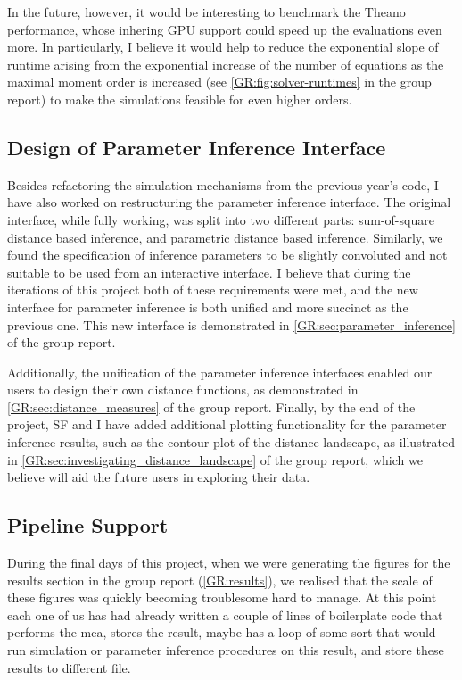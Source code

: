 In the future, however, it would be interesting to benchmark the Theano performance, whose inhering GPU support could speed up the evaluations even more.
In particularly, I believe it would help to reduce the exponential slope of runtime arising from the exponential increase of the number of equations as the maximal moment order is increased (see \autoref{GR:fig:solver-runtimes} in the group report) to make the simulations feasible for even higher orders. 

\subsection{Design of Parameter Inference Interface}

Besides refactoring the simulation mechanisms from the previous year's code, I have also worked on restructuring the parameter inference interface. 
The original interface, while fully working, was split into two different parts: sum-of-square distance based inference, and parametric distance based inference. Similarly, we found the specification of inference parameters to be slightly convoluted and not suitable to be used from an interactive interface. 
I believe that during the iterations of this project both of these requirements were met, and the new interface for parameter inference is
both unified and more succinct as the previous one. This new interface is demonstrated in \autoref*{GR:sec:parameter_inference} of the group report.

Additionally, the unification of the parameter inference interfaces enabled our users to design their own distance functions, as demonstrated in \autoref*{GR:sec:distance_measures} of the group report.
Finally, by the end of the project, SF and I have added additional plotting functionality for the parameter inference results, such as the contour plot of the distance landscape, as illustrated in 
\autoref*{GR:sec:investigating_distance_landscape} of the group report, which we believe will aid the future users in exploring their data.

\subsection{Pipeline Support}

During the final days of this project, when we were generating the figures for the results section in the group report (\autoref{GR:results}), we realised that the scale of these figures was quickly becoming troublesome hard to manage. 
At this point each one of us has had already written a couple of lines of boilerplate code that performs the \acrlong{mea}, stores the result, maybe has a loop of some sort that would run simulation or parameter inference procedures on this result, and store these results to different file.

